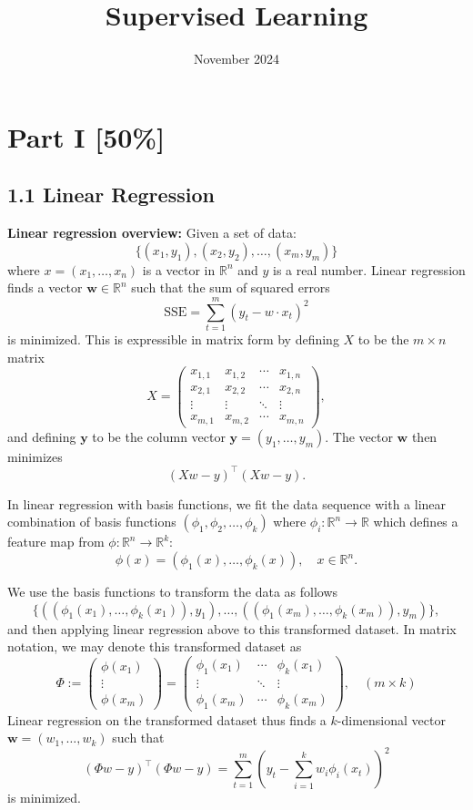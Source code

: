 \documentclass{article}
\title{Supervised Learning}
\date{November 2024}
\begin{document}
\maketitle

\section*{Part I [50\%]}

\subsection*{1.1 Linear Regression}

\textbf{Linear regression overview:} Given a set of data:
\[
\{(x_1, y_1), (x_2, y_2), \ldots, (x_m, y_m)\}
\tag{1}\]
where \(x = (x_1, \ldots, x_n)\) is a vector in \(\mathbb{R}^n\) and \(y\) is a real number. Linear regression finds a vector \(\mathbf{w} \in \mathbb{R}^n\) such that the sum of squared errors
\[
\text{SSE} = \sum_{t=1}^m (y_t - w \cdot x_t)^2 \tag{2}
\]
is minimized. This is expressible in matrix form by defining \(X\) to be the \(m \times n\) matrix
\[
X = 
\begin{pmatrix}
x_{1,1} & x_{1,2} & \cdots & x_{1,n} \\
x_{2,1} & x_{2,2} & \cdots & x_{2,n} \\
\vdots & \vdots & \ddots & \vdots \\
x_{m,1} & x_{m,2} & \cdots & x_{m,n}
\end{pmatrix}, \tag{3}
\]
and defining \(\mathbf{y}\) to be the column vector \(\mathbf{y} = (y_1, \ldots, y_m)\). The vector \(\mathbf{w}\) then minimizes
\[
(Xw - y)^\top (Xw - y).
\]

In linear regression with basis functions, we fit the data sequence with a linear combination of basis functions \((\phi_1, \phi_2, \ldots, \phi_k)\) where \(\phi_i : \mathbb{R}^n \to \mathbb{R}\) which defines a feature map from \(\phi : \mathbb{R}^n \to \mathbb{R}^k\):
\[
\phi(x) = (\phi_1(x), \ldots, \phi_k(x)), \quad x \in \mathbb{R}^n.
\]

We use the basis functions to transform the data as follows
\[
\{((\phi_1(x_1), \ldots, \phi_k(x_1)), y_1), \ldots, ((\phi_1(x_m), \ldots, \phi_k(x_m)), y_m)\}, \tag{4}
\]
and then applying linear regression above to this transformed dataset. In matrix notation, we may denote this transformed dataset as
\[
\Phi := 
\begin{pmatrix}
\phi(x_1) \\
\vdots \\
\phi(x_m)
\end{pmatrix}
=
\begin{pmatrix}
\phi_1(x_1) & \cdots & \phi_k(x_1) \\
\vdots & \ddots & \vdots \\
\phi_1(x_m) & \cdots & \phi_k(x_m)
\end{pmatrix},
\quad (m \times k) \tag{5}
\]
Linear regression on the transformed dataset thus finds a \(k\)-dimensional vector \(\mathbf{w} = (w_1, \ldots, w_k)\) such that
\[
(\Phi w - y)^\top (\Phi w - y) = \sum_{t=1}^m \left(y_t - \sum_{i=1}^k w_i \phi_i(x_t) \right)^2 \tag{6}
\]
is minimized.
\end{document}
